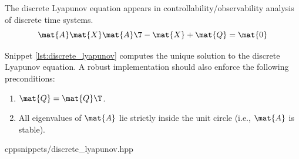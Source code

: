The discrete Lyapunov equation appears in controllability/observability analysis
of discrete time systems.
\begin{equation}
  \mat{A}\mat{X}\mat{A}\T - \mat{X} + \mat{Q} = \mat{0}
\end{equation}

Snippet \ref{lst:discrete_lyapunov} computes the unique solution to the
discrete Lyapunov equation. A robust implementation should also enforce the
following preconditions:
\begin{enumerate}
  \item $\mat{Q} = \mat{Q}\T$.
  \item All eigenvalues of $\mat{A}$ lie strictly inside the unit circle (i.e.,
    $\mat{A}$ is stable).
\end{enumerate}
\begin{coderemote}{cpp}{snippets/discrete_lyapunov.hpp}
  \caption{Discrete Lyapunov equation solver in C++}
  \label{lst:discrete_lyapunov}
\end{coderemote}
